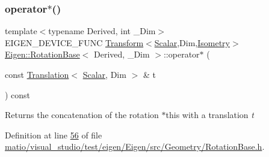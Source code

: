 \subsubsection{\texorpdfstring{operator$\ast$()}{operator*()}\hspace{0.1cm}{\footnotesize\ttfamily [1/8]}}
{\footnotesize\ttfamily template$<$typename Derived, int \+\_\+\+Dim$>$ \\
E\+I\+G\+E\+N\+\_\+\+D\+E\+V\+I\+C\+E\+\_\+\+F\+U\+NC \hyperlink{group___geometry___module_class_eigen_1_1_transform}{Transform}$<$\hyperlink{class_eigen_1_1_rotation_base_af9b43eac462d7aa70b018efd49c13ef4}{Scalar},Dim,\hyperlink{group__enums_ggaee59a86102f150923b0cac6d4ff05107a080cd5366173608f701cd945c2335568}{Isometry}$>$ \hyperlink{class_eigen_1_1_rotation_base}{Eigen\+::\+Rotation\+Base}$<$ Derived, \+\_\+\+Dim $>$\+::operator$\ast$ (\begin{DoxyParamCaption}\item[{const \hyperlink{group___geometry___module_class_eigen_1_1_translation}{Translation}$<$ \hyperlink{class_eigen_1_1_rotation_base_af9b43eac462d7aa70b018efd49c13ef4}{Scalar}, Dim $>$ \&}]{t }\end{DoxyParamCaption}) const\hspace{0.3cm}{\ttfamily [inline]}}

\begin{DoxyReturn}{Returns}
the concatenation of the rotation {\ttfamily $\ast$this} with a translation {\itshape t} 
\end{DoxyReturn}


Definition at line \hyperlink{matio_2visual__studio_2test_2eigen_2_eigen_2src_2_geometry_2_rotation_base_8h_source_l00056}{56} of file \hyperlink{matio_2visual__studio_2test_2eigen_2_eigen_2src_2_geometry_2_rotation_base_8h_source}{matio/visual\+\_\+studio/test/eigen/\+Eigen/src/\+Geometry/\+Rotation\+Base.\+h}.

\mbox{\label{class_eigen_1_1_rotation_base_a4b09a2174ee14f0aa71bc0285c9045a9}} 
